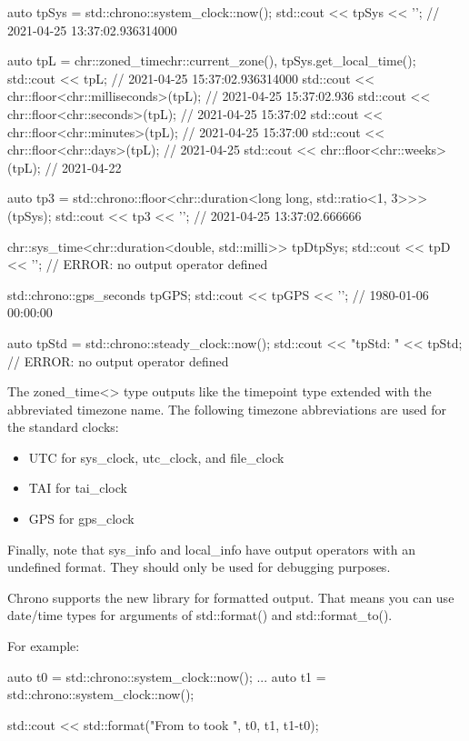 \begin{cpp}
auto tpSys = std::chrono::system_clock::now();
std::cout << tpSys << '\n'; // 2021-04-25 13:37:02.936314000

auto tpL = chr::zoned_time{chr::current_zone(), tpSys}.get_local_time();
std::cout << tpL; // 2021-04-25 15:37:02.936314000
std::cout << chr::floor<chr::milliseconds>(tpL); // 2021-04-25 15:37:02.936
std::cout << chr::floor<chr::seconds>(tpL); // 2021-04-25 15:37:02
std::cout << chr::floor<chr::minutes>(tpL); // 2021-04-25 15:37:00
std::cout << chr::floor<chr::days>(tpL); // 2021-04-25
std::cout << chr::floor<chr::weeks>(tpL); // 2021-04-22

auto tp3 = std::chrono::floor<chr::duration<long long, std::ratio<1, 3>>>(tpSys);
std::cout << tp3 << '\n'; // 2021-04-25 13:37:02.666666

chr::sys_time<chr::duration<double, std::milli>> tpD{tpSys};
std::cout << tpD << '\n'; // ERROR: no output operator defined

std::chrono::gps_seconds tpGPS;
std::cout << tpGPS << '\n'; // 1980-01-06 00:00:00

auto tpStd = std::chrono::steady_clock::now();
std::cout << "tpStd: " << tpStd; // ERROR: no output operator defined
\end{cpp}

The zoned\_time<> type outputs like the timepoint type extended with the abbreviated timezone name. The following timezone abbreviations are used for the standard clocks:

\begin{itemize}
\item 
UTC for sys\_clock, utc\_clock, and file\_clock

\item 
TAI for tai\_clock

\item 
GPS for gps\_clock
\end{itemize}

Finally, note that sys\_info and local\_info have output operators with an undefined format. They should only be used for debugging purposes.


Chrono supports the new library for formatted output. That means you can use date/time types for arguments of std::format() and std::format\_to().

For example:

\begin{cpp}
auto t0 = std::chrono::system_clock::now();
...
auto t1 = std::chrono::system_clock::now();

std::cout << std::format("From {} to {}\nit took {}\n", t0, t1, t1-t0);
\end{cpp}

